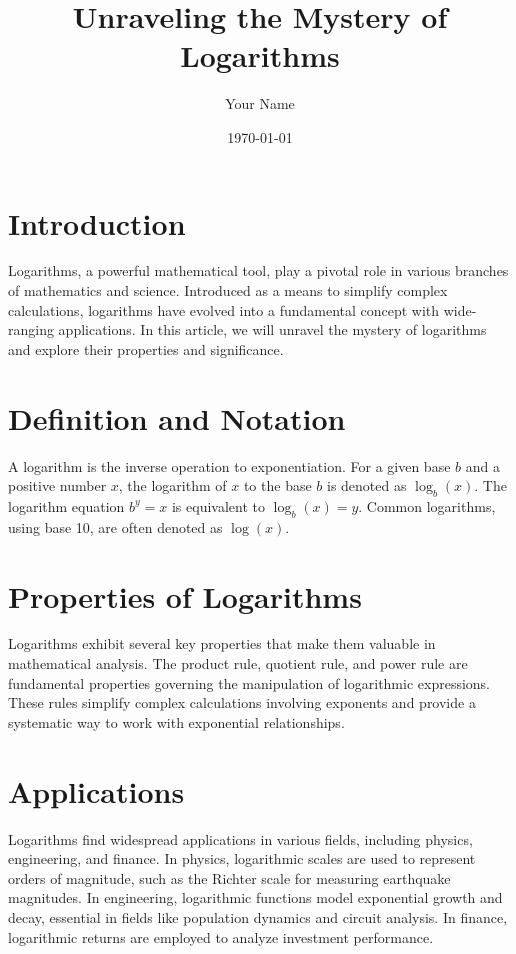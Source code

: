 \documentclass{article}
\title{Unraveling the Mystery of Logarithms}
\author{Your Name}
\date{\today}
\begin{document}
\maketitle

\section*{Introduction}
Logarithms, a powerful mathematical tool, play a pivotal role in various branches of mathematics and science. Introduced as a means to simplify complex calculations, logarithms have evolved into a fundamental concept with wide-ranging applications. In this article, we will unravel the mystery of logarithms and explore their properties and significance.

\section*{Definition and Notation}
A logarithm is the inverse operation to exponentiation. For a given base $b$ and a positive number $x$, the logarithm of $x$ to the base $b$ is denoted as $\log_b(x)$. The logarithm equation $b^y = x$ is equivalent to $\log_b(x) = y$. Common logarithms, using base 10, are often denoted as $\log(x)$.

\section*{Properties of Logarithms}
Logarithms exhibit several key properties that make them valuable in mathematical analysis. The product rule, quotient rule, and power rule are fundamental properties governing the manipulation of logarithmic expressions. These rules simplify complex calculations involving exponents and provide a systematic way to work with exponential relationships.

\section*{Applications}
Logarithms find widespread applications in various fields, including physics, engineering, and finance. In physics, logarithmic scales are used to represent orders of magnitude, such as the Richter scale for measuring earthquake magnitudes. In engineering, logarithmic functions model exponential growth and decay, essential in fields like population dynamics and circuit analysis. In finance, logarithmic returns are employed to analyze investment performance.
\end{document}
